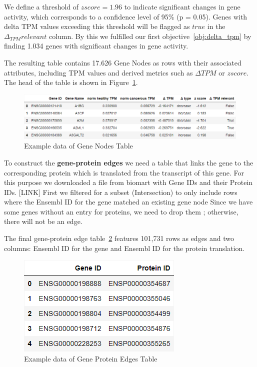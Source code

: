 We define a threshold of  $z score = 1.96$ to indicate significant changes in gene activity,
which corresponds to a confidence level of 95\% (p = 0.05).
Genes with delta TPM values exceeding this threshold will be flagged as $true$ in the $\Delta_{TPM} relevant$ column.
By this we fulfilled our first objective~\ref{obj:delta_tpm} by finding 1.034 genes with significant changes in gene activity.

The resulting table contains 17.626 Gene Nodes as rows with their associated attributes,
including TPM values and derived metrics such as $\Delta TPM$ or $z score$.
The head of the table is shown in Figure~\ref{fig:03_02_df_gene_nodes}.

\begin{figure}[h]
    \centering
    \includegraphics[height=\dfheight]{figures/03_02_gene_nodes}
    \caption{Example data of Gene Nodes Table}
    \label{fig:03_02_df_gene_nodes}
\end{figure}

To construct the \textbf{gene-protein edges} we need a table that links the gene to the corresponding protein
which is translated from the transcript of this gene.
For this purpose we downloaded a file from biomart with Gene IDs and their Protein IDs. [LINK]
First we filtered for a subset (Intersection) to only include rows where the Ensembl ID for the gene matched an existing gene node
Since we have some genes without an entry for proteins, we need to drop them ; otherwise, there will not be an edge.

The final gene-protein edge table~\ref{fig:03_02_df_gene_protein_edges} features 101,731 rows as edges and two columns:
Ensembl ID for the gene and Ensembl ID for the protein translation.

\begin{figure}[h]
    \centering
    \includegraphics[height=\dfheight]{figures/03_02_gene_protein_edges}
    \caption{Example data of Gene Protein Edges Table}
    \label{fig:03_02_df_gene_protein_edges}
\end{figure}


